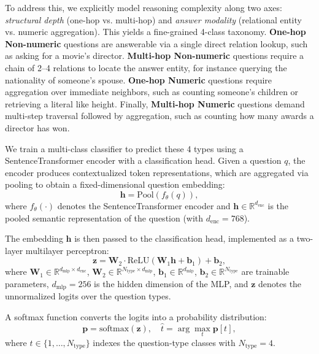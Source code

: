 \documentclass[conference]{IEEEtran}
\begin{document}
To address this, we explicitly model reasoning complexity along two axes: \textit{structural depth} (one-hop vs. multi-hop) and \textit{answer modality} (relational entity vs. numeric aggregation). This yields a fine-grained 4-class taxonomy. \textbf{One-hop Non-numeric} questions are answerable via a single direct relation lookup, such as asking for a movie's director. \textbf{Multi-hop Non-numeric} questions require a chain of 2--4 relations to locate the answer entity, for instance querying the nationality of someone's spouse. \textbf{One-hop Numeric} questions require aggregation over immediate neighbors, such as counting someone's children or retrieving a literal like height. Finally, \textbf{Multi-hop Numeric} questions demand multi-step traversal followed by aggregation, such as counting how many awards a director has won.

We train a multi-class classifier to predict these 4 types using a SentenceTransformer encoder \cite{reimers2019sbert, xiao2024bge} with a classification head. Given a question $q$, the encoder produces contextualized token representations, which are aggregated via pooling to obtain a fixed-dimensional question embedding:
\begin{equation}
\label{eq:pool}
    \mathbf{h} = \text{Pool}(f_{\theta}(q)),
\end{equation}
where $f_{\theta}(\cdot)$ denotes the SentenceTransformer encoder and $\mathbf{h} \in \mathbb{R}^{d_{\text{enc}}}$ is the pooled semantic representation of the question (with $d_{\text{enc}} = 768$).

The embedding $\mathbf{h}$ is then passed to the classification head, implemented as a two-layer multilayer perceptron:
\begin{equation}
\label{eq:mlp}
    \mathbf{z} = \mathbf{W}_2 \cdot \text{ReLU}(\mathbf{W}_1\mathbf{h} + \mathbf{b}_1) + \mathbf{b}_2,
\end{equation}
where $\mathbf{W}_1 \in \mathbb{R}^{d_{\text{mlp}} \times d_{\text{enc}}}$, $\mathbf{W}_2 \in \mathbb{R}^{N_{\text{type}} \times d_{\text{mlp}}}$, $\mathbf{b}_1 \in \mathbb{R}^{d_{\text{mlp}}}$, $\mathbf{b}_2 \in \mathbb{R}^{N_{\text{type}}}$ are trainable parameters, $d_{\text{mlp}} = 256$ is the hidden dimension of the MLP, and $\mathbf{z}$ denotes the unnormalized logits over the question types.

A softmax function converts the logits into a probability distribution:
\begin{equation}
\label{eq:softmax}
    \mathbf{p} = \text{softmax}(\mathbf{z}), \quad \hat{t} = \arg\max_{t} \mathbf{p}[t],
\end{equation}
where $t \in \{1, \ldots, N_{\text{type}}\}$ indexes the question-type classes with $N_{\text{type}} = 4$.
\end{document}
